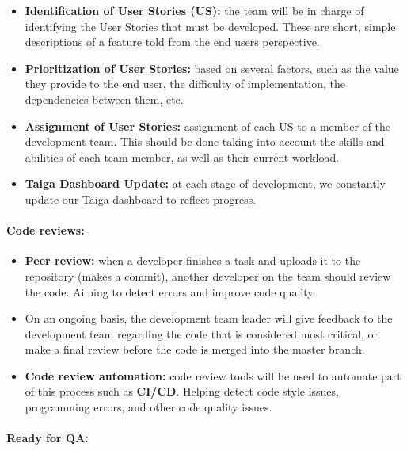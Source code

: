 \begin{itemize}
\tightlist
\item
  \textbf{Identification of User Stories (US):} the team will be in
  charge of identifying the User Stories that must be developed. These
  are short, simple descriptions of a feature told from the end
  user\textquotesingle s perspective.
\item
  \textbf{Prioritization of User Stories:} based on several factors,
  such as the value they provide to the end user, the difficulty of
  implementation, the dependencies between them, etc.
\item
  \textbf{Assignment of User Stories:} assignment of each US to a member
  of the development team. This should be done taking into account the
  skills and abilities of each team member, as well as their current
  workload.
\item
  \textbf{Taiga Dashboard Update:} at each stage of development, we
  constantly update our Taiga dashboard to reflect progress.
\end{itemize}

\hypertarget{codereviewsnbsp}{
\paragraph{Code reviews:~}\label{codereviewsnbsp}}

\begin{itemize}
\tightlist
\item
  \textbf{Peer review:} when a developer finishes a task and uploads it
  to the repository (makes a commit), another developer on the team
  should review the code. Aiming to detect errors and improve code
  quality.
\item
  On an ongoing basis, the development team leader will give feedback to
  the development team regarding the code that is considered most
  critical, or make a final review before the code is merged into the
  master branch.
\item
  \textbf{Code review automation:} code review tools will be used to
  automate part of this process such as \textbf{CI/CD}. Helping detect
  code style issues, programming errors, and other code quality issues.
\end{itemize}

\hypertarget{readyforqa}{
\paragraph{Ready for QA:}\label{readyforqa}}

